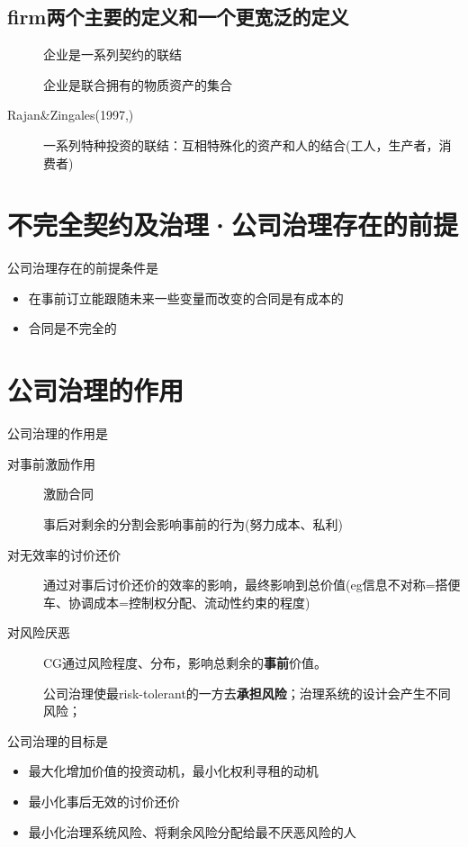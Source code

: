 \documentclass[a4paper]{article}
\begin{document}
\subsection{firm两个主要的定义和一个更宽泛的定义}
\begin{description}	
	\item[\citet{alchian1972}] 企业是一系列契约的联结
	\item[\citet{grossman1986}] 企业是联合拥有的物质资产的集合
	\item[Rajan\&Zingales(1997,\citeyear{rajan1998})] 一系列特种投资的联结：互相特殊化的资产和人的结合(工人，生产者，消费者)

\end{description}

%
\section{不完全契约及治理·公司治理存在的前提}
公司治理存在的前提条件是
\begin{itemize}
	\item 在事前订立能跟随未来一些变量而改变的合同是有成本的
	\item 合同是不完全的
\end{itemize}

%
\section{公司治理的作用}
公司治理的作用是
\begin{description}
	\item[对事前激励作用] 激励合同\par
	事后对剩余的分割会影响事前的行为(努力成本、私利)
	\item[对无效率的讨价还价] 
	通过对事后讨价还价的效率的影响，最终影响到总价值(eg信息不对称=搭便车、协调成本=控制权分配、流动性约束的程度\citet{aghion1992})
	\item[对风险厌恶] CG通过风险程度、分布，影响总剩余的\textbf{事前}价值。\par
	公司治理使最risk-tolerant的一方去\textbf{承担风险}；治理系统的设计会产生不同风险；
	
\end{description}
公司治理的目标是
\begin{itemize}
	\item 最大化增加价值的投资动机，最小化权利寻租的动机
	\item 最小化事后无效的讨价还价
	\item 最小化治理系统风险、将剩余风险分配给最不厌恶风险的人
\end{itemize}
\end{document}
